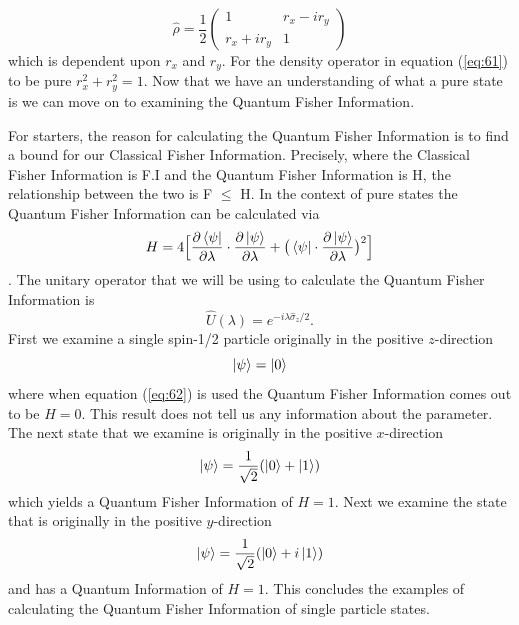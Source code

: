 \documentclass[twocolumn]{article}
\begin{document}
\begin{equation} \label{eq:61}
\hat{\rho}=\frac{1}{2}
\begin{pmatrix}
1 & r_x-ir_y \\
r_x+ir_y & 1
\end{pmatrix}
\end{equation}
which is dependent upon $r_x$ and $r_y$. For the density operator in equation (\ref{eq:61}) to be pure $r_x^2+r_y^2=1$. Now that we have an understanding of what a pure state is we can move on to examining the Quantum Fisher Information.

For starters, the reason for calculating the Quantum Fisher Information is to find a bound for our Classical Fisher Information. Precisely, where the Classical Fisher Information is F.I and the Quantum Fisher Information is H, the relationship between the two is F $\leq$ H. In the context of pure states the Quantum Fisher Information can be calculated via
\begin{equation} \label{eq:62}
H=4\Big[\frac{\partial\bra{\psi}}{\partial\lambda}\cdot\frac{\partial\ket{\psi}}{\partial\lambda}+\big(\bra{\psi}\cdot\frac{\partial\ket{\psi}}{\partial\lambda}\big)^2\Big]
\end{equation}
\cite{D. Collins}. The unitary operator that we will be using to calculate the Quantum Fisher Information is
\begin{equation} \label{eq:63}
\hat{U}(\lambda)=e^{-i\lambda\hat{\sigma}_z/2}.
\end{equation}
First we examine a single spin-1/2 particle originally in the positive $z$-direction
\begin{equation} \label{eq:64}
\ket{\psi}=\ket{0}
\end{equation}
where when equation (\ref{eq:62}) is used the Quantum Fisher Information comes out to be $H=0$. This result does not tell us any information about the parameter. The next state that we examine is originally in the positive $x$-direction
\begin{equation} \label{eq:65}
\ket{\psi}=\frac{1}{\sqrt{2}}(\ket{0}+\ket{1})
\end{equation}
which yields a Quantum Fisher Information of $H=1$. Next we examine the state that is originally in the positive $y$-direction
\begin{equation} \label{eq:66}
\ket{\psi}=\frac{1}{\sqrt{2}}(\ket{0}+i\ket{1})
\end{equation}
and has a Quantum Information of $H=1$. This concludes the examples of calculating the Quantum Fisher Information of single particle states.
\end{document}
